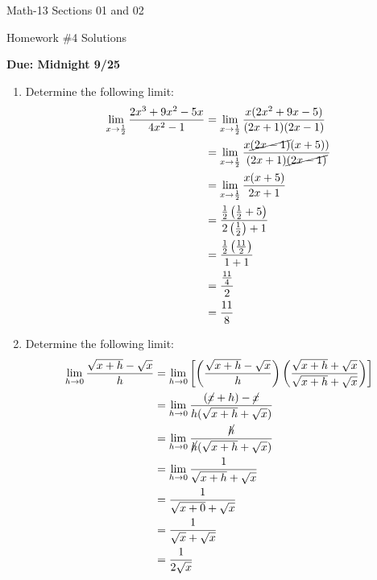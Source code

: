 \documentclass[letterpaper,12pt,fleqn]{article}
\begin{document}
\begin{center}
  \large
  Math-13 Sections 01 and 02

  \Large
  Homework \#4 Solutions

  \large
  \textbf{Due: Midnight 9/25}
\end{center}

\begin{enumerate}
\item Determine the following limit:
  \begin{align*}
    \lim_{x\to\frac{1}{2}}\frac{2x^3+9x^2-5x}{4x^2-1} &= \lim_{x\to\frac{1}{2}}\frac{x(2x^2+9x-5)}{(2x+1)(2x-1)} \\
    &= \lim_{x\to\frac{1}{2}}\frac{x\cancel{(2x-1)}(x+5))}{(2x+1)\cancel{(2x-1)}} \\
    &= \lim_{x\to\frac{1}{2}}\frac{x(x+5)}{2x+1} \\
    &= \frac{\frac{1}{2}\left(\frac{1}{2}+5\right)}{2\left(\frac{1}{2}\right)+1} \\
    &= \frac{\frac{1}{2}\left(\frac{11}{2}\right)}{1+1} \\
    &= \frac{\frac{11}{4}}{2} \\
    &= \frac{11}{8}
  \end{align*}

\item Determine the following limit:
  \begin{align*}  
    \lim_{h\to0}\frac{\sqrt{x+h}-\sqrt{x}}{h}
    &= \lim_{h\to0}\left[\left(\frac{\sqrt{x+h}-\sqrt{x}}{h}\right)
      \left(\frac{\sqrt{x+h}+\sqrt{x}}{\sqrt{x+h}+\sqrt{x}}\right)\right] \\
    &= \lim_{h\to0}\frac{(\cancel{x}+h)-\cancel{x}}{h(\sqrt{x+h}+\sqrt{x})} \\
    &= \lim_{h\to0}\frac{\cancel{h}}{\cancel{h}(\sqrt{x+h}+\sqrt{x})} \\
    &= \lim_{h\to0}\frac{1}{\sqrt{x+h}+\sqrt{x}} \\
    &= \frac{1}{\sqrt{x+0}+\sqrt{x}} \\
    &= \frac{1}{\sqrt{x}+\sqrt{x}} \\
    &= \frac{1}{2\sqrt{x}}
  \end{align*}
\end{enumerate}
\end{document}
